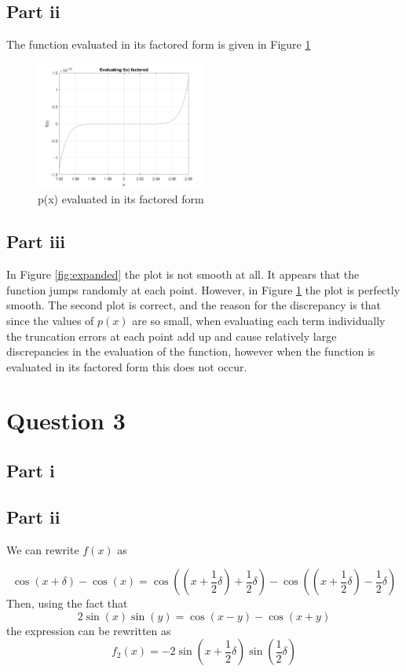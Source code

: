 \documentclass[12pt]{exam}
\begin{document}
\subsection*{Part ii}
The function evaluated in its factored form is given in Figure \ref{fig:factored}
\begin{figure}[h!]
\centering
\includegraphics[width=0.5\textwidth]{q2p2.png}
\caption{p(x) evaluated in its factored form}\label{fig:factored}
\end{figure}
\subsection*{Part iii}

In Figure \ref{fig:expanded} the plot is not smooth at all. It appears that the function jumps randomly at each point. However, in Figure \ref{fig:factored} the plot is perfectly smooth. The second plot is correct, and the reason for the discrepancy is that since the values of $p(x)$ are so small, when evaluating each term individually the truncation errors at each point add up and cause relatively large discrepancies in the evaluation of the function, however when the function is evaluated in its factored form this does not occur.

\newpage

\section*{Question 3}

\subsection*{Part i}

\subsection*{Part ii}
We  can rewrite $f(x)$ as

\begin{equation}
\cos(x+\delta)-\cos(x)=\cos \left( \left(x+\frac{1}{2}\delta \right)+\frac{1}{2}\delta\right)-\cos\left(\left(x+\frac{1}{2}\delta\right)-\frac{1}{2}\delta\right)
\end{equation}
Then, using the fact that
\begin{equation}
2\sin(x)\sin(y)=\cos(x-y)-\cos(x+y)
\end{equation} 
the expression can be rewritten as 
\begin{equation}
f_2(x)=-2\sin\left( x+\frac{1}{2}\delta \right)\sin \left(\frac{1}{2}\delta\right)
\end{equation}
\end{document}
